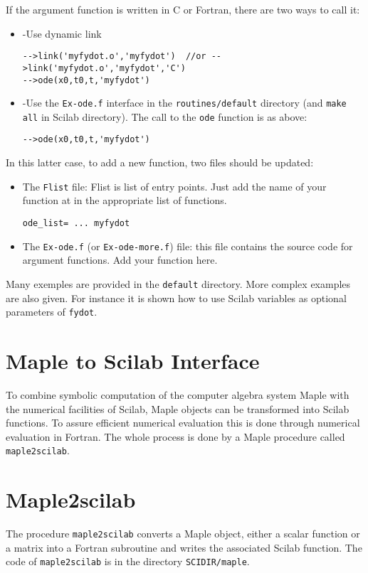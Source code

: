 If the argument function is written in C or Fortran, there
are two ways to call it:
\begin{itemize}
\item -Use dynamic link
\begin{verbatim}
-->link('myfydot.o','myfydot')  //or -->link('myfydot.o','myfydot','C')
-->ode(x0,t0,t,'myfydot')
\end{verbatim}
\item -Use the {\tt Ex-ode.f} interface in the {\tt routines/default}
directory (and {\tt make all} in Scilab directory).
The call to the {\tt ode} function is as above:
\begin{verbatim}
-->ode(x0,t0,t,'myfydot')
\end{verbatim}
\end{itemize}
In this latter case, to add a new function, two files should be updated:
\begin{itemize}
\item The {\tt Flist} file: Flist is list of entry points. Just add the 
name of your function at in the appropriate list of functions.
\begin{verbatim}
ode_list= ... myfydot
\end{verbatim}
\item The {\tt Ex-ode.f} (or {\tt Ex-ode-more.f}) file: this file contains the 
source code for argument functions. Add your function here.
\end{itemize}

Many exemples are provided in the {\tt default} directory.
More complex examples are also given. For instance it is shown 
how to use Scilab variables as optional parameters of {\tt fydot}.

\section{Maple to Scilab Interface}
To combine symbolic computation of the computer algebra system Maple with the 
numerical facilities
of Scilab, Maple objects can be transformed into Scilab functions. To assure 
efficient numerical evaluation this is done through numerical evaluation in 
Fortran. The whole process is done by a Maple procedure called 
\verb/maple2scilab/.
\section{Maple2scilab}
The procedure \verb!maple2scilab! converts a Maple object, 
either a scalar function or a matrix into a Fortran subroutine 
and writes the associated Scilab function. The code of \verb!maple2scilab!
is in the directory \verb!SCIDIR/maple!.

